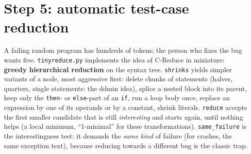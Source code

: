 \documentclass[10pt,a4paper,openany,oneside]{report}
\newcommand{\prio}[1]{\texorpdfstring{\ifcase#1\or{\color{gold}\ding{72}}\or{\color{gold}\ding{72}\ding{72}}\or{\color{gold}\ding{72}\ding{72}\ding{72}}\fi}{}}
\begin{document}
\section{Step 5: automatic test-case reduction \prio{3}}
A failing random program has hundreds of tokens; the person who fixes the bug wants five. \texttt{tinyreduce.py} implements the idea of C-Reduce in miniature: \textbf{greedy hierarchical reduction} on the syntax tree. \texttt{shrinks} yields simpler variants of a node, most aggressive first: delete chunks of statements (halves, quarters, single statements: the ddmin idea), splice a nested block into its parent, keep only the \texttt{then}- or \texttt{else}-part of an \texttt{if}, run a loop body once, replace an expression by one of its operands or by a constant, shrink literals. \texttt{reduce} accepts the first smaller candidate that is still \emph{interesting} and starts again, until nothing helps (a local minimum, ``1-minimal'' for these transformations). \texttt{same\_failure} is the interestingness test: it demands the \emph{same kind} of failure (for crashes, the same exception text), because reducing towards a different bug is the classic trap.
\end{document}

